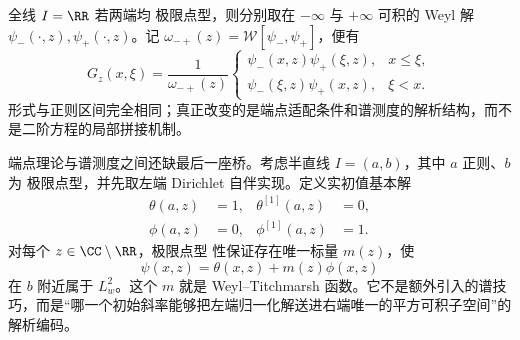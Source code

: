 全线 $I=\RR$ 若两端均 极限点型，则分别取在 $-\infty$ 与 $+\infty$ 可积的 Weyl 解 $\psi_-(\cdot,z),\psi_+(\cdot,z)$。记 $\omega_{-+}(z)=\mathcal W[\psi_-,\psi_+]$，便有
\begin{equation}\label{eq:math-sl-green-line}
 G_z(x,\xi)=\frac{1}{\omega_{-+}(z)}
 \begin{cases}
 \psi_-(x,z)\psi_+(\xi,z),&x\le\xi,\\
 \psi_-(\xi,z)\psi_+(x,z),&\xi<x.
 \end{cases}
\end{equation}
形式与正则区间完全相同；真正改变的是端点适配条件和谱测度的解析结构，而不是二阶方程的局部拼接机制。

端点理论与谱测度之间还缺最后一座桥。考虑半直线 $I=(a,b)$，其中 $a$ 正则、$b$ 为 极限点型，并先取左端 Dirichlet 自伴实现。定义实初值基本解
\begin{equation}\label{eq:math-sl-theta-phi-initial}
\begin{aligned}
 \theta(a,z)&=1,&\theta^{[1]}(a,z)&=0,\\
 \phi(a,z)&=0,&\phi^{[1]}(a,z)&=1.
\end{aligned}
\end{equation}
对每个 $z\in\CC\setminus\RR$，极限点型 性保证存在唯一标量 $m(z)$，使
\begin{equation}\label{eq:math-sl-weyl-solution-m}
 \psi(x,z)=\theta(x,z)+m(z)\phi(x,z)
\end{equation}
在 $b$ 附近属于 $L^2_w$。这个 $m$ 就是 Weyl--Titchmarsh 函数。它不是额外引入的谱技巧，而是“哪一个初始斜率能够把左端归一化解送进右端唯一的平方可积子空间”的解析编码。

